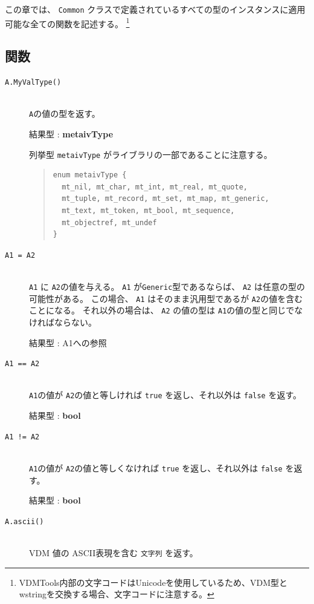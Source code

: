 \documentclass[\pformat,12pt]{jarticle}
\begin{document}
この章では、 {\tt Common} クラスで定義されているすべての型のインスタンスに適用可能な全ての関数を記述する。
\footnote{VDMTools内部の文字コードはUnicodeを使用しているため、VDM型とwstringを交換する場合、文字コードに注意する。}
\subsection*{関数}

\begin{description}
\item[{\tt A.MyValType()}] \mbox{}\\
     {\tt A}の値の型を返す。

     結果型 : {\bf metaivType}
     
     \vspace{1cm}
     列挙型 {\tt metaivType} がライブラリの一部であることに注意する。

\begin{quote}
\begin{verbatim}
enum metaivType {
  mt_nil, mt_char, mt_int, mt_real, mt_quote,
  mt_tuple, mt_record, mt_set, mt_map, mt_generic,
  mt_text, mt_token, mt_bool, mt_sequence, 
  mt_objectref, mt_undef
}
\end{verbatim}
\end{quote}

\item[{\tt A1 = A2}] \mbox{}\\
     {\tt A1} に {\tt A2}の値を与える。
{\tt A1} が{\tt Generic}型であるならば、 {\tt A2} は任意の型の可能性がある。
この場合、 {\tt A1} はそのまま汎用型であるが {\tt A2}の値を含むことになる。
それ以外の場合は、 {\tt A2} の値の型は {\tt A1}の値の型と同じでなければならない。

結果型 : A1への参照 
     
\item[{\tt A1 == A2}] \mbox{}\\
  {\tt A1}の値が {\tt A2}の値と等しければ {\tt true} を返し、それ以外は {\tt false} を返す。

     結果型 : {\bf bool}

\item[{\tt A1 != A2}] \mbox{}\\
  {\tt A1}の値が {\tt A2}の値と等しくなければ {\tt true} を返し、それ以外は {\tt false} を返す。

     結果型 : {\bf bool}

\item[{\tt A.ascii()}] \mbox{}\\
  VDM 値の ASCII表現を含む {\tt 文字列} を返す。


\end{description}
\end{document}
